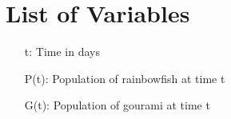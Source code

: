 \section*{List of Variables}

\begin{itemize}
    \item[t:] Time in days
    \item[P(t):] Population of rainbowfish at time t
    \item[G(t):] Population of gourami at time t
\end{itemize}